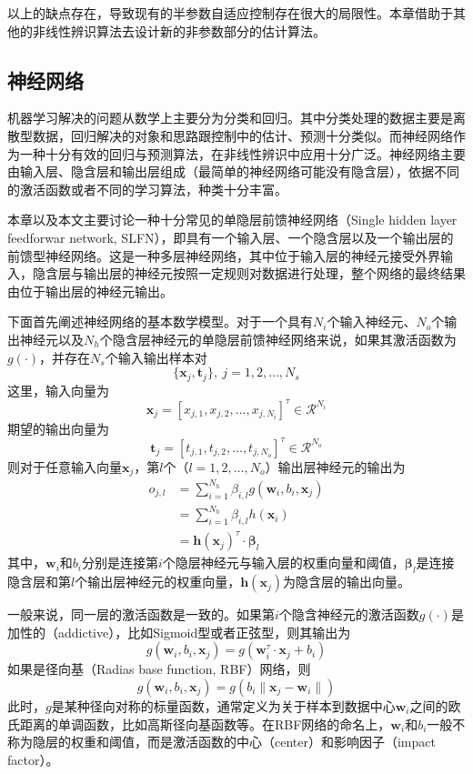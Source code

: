 以上的缺点存在，导致现有的半参数自适应控制存在很大的局限性。本章借助于其他的非线性辨识算法去设计新的非参数部分的估计算法。

\subsection{神经网络}
机器学习解决的问题从数学上主要分为分类和回归。其中分类处理的数据主要是离散型数据，回归解决的对象和思路跟控制中的估计、预测十分类似。而神经网络作为一种十分有效的回归与预测算法，在非线性辨识中应用十分广泛。神经网络主要由输入层、隐含层和输出层组成（最简单的神经网络可能没有隐含层），依据不同的激活函数或者不同的学习算法，种类十分丰富。

本章以及本文主要讨论一种十分常见的单隐层前馈神经网络（Single hidden layer feedforwar network, SLFN），即具有一个输入层、一个隐含层以及一个输出层的前馈型神经网络。这是一种多层神经网络，其中位于输入层的神经元接受外界输入，隐含层与输出层的神经元按照一定规则对数据进行处理，整个网络的最终结果由位于输出层的神经元输出。

下面首先阐述神经网络的基本数学模型。对于一个具有$N_{i}$个输入神经元、$N_{o}$个输出神经元以及$N_{h}$个隐含层神经元的单隐层前馈神经网络来说，如果其激活函数为$g(\cdot)$，并存在$N_{s}$个输入输出样本对
$$\{\bm{x}_{j},\bm{t}_{j}\},\ j=1,2,\ldots,N_{s}$$
这里，输入向量为
$$\bm{x}_{j}=[x_{j,1},x_{j,2},\ldots,x_{j,N_{i}}]^{\tau}\in \mathcal{R}^{N_{i}}$$
期望的输出向量为
$$\bm{t}_{j}=[t_{j,1},t_{j,2},\ldots,t_{j,N_{o}}]^{\tau}\in \mathcal{R}^{N_{o}}$$
则对于任意输入向量$\bm{x}_{j}$，第$l$个（$l=1,2,\dots,N_{o}$）输出层神经元的输出为
\begin{equation}%
\label{eq:4.slfn.o}
\begin{split}%
o_{j,l}&=\sum_{i=1}^{N_{h}} \beta_{i,l} g(\bm{w}_{i},b_{i},\bm{x}_{j})\\
&=\sum_{i=1}^{N_{h}} \beta_{i,l} h(\bm{x}_{i})\\
&=\bm{h}(\bm{x}_{j})^{\tau}\cdot\bm{\beta}_{l}
\end{split}
\end{equation}
其中，$\bm{w}_{i}$和$b_{i}$分别是连接第$i$个隐层神经元与输入层的权重向量和阈值，$\bm{\beta}_{l}$是连接隐含层和第$l$个输出层神经元的权重向量，$\bm{h}(\bm{x}_{j})$为隐含层的输出向量。

一般来说，同一层的激活函数是一致的。如果第$i$个隐含神经元的激活函数$g(\cdot)$是加性的（addictive），比如Sigmoid型或者正弦型，则其输出为
\begin{equation}%
g(\bm{w}_{i},b_{i},\bm{x}_{j})=g(\bm{w}_{i}^{\tau}\cdot\bm{x}_{j}+b_{i})
\end{equation}
如果是径向基（Radias base function, RBF）网络，则
\begin{equation}%
g(\bm{w}_{i},b_{i},\bm{x}_{j})=g(b_{i}\|\bm{x}_{j}-\bm{w}_{i}\|)
\end{equation}
此时，$g$是某种径向对称的标量函数，通常定义为关于样本到数据中心$\bm{w}_{i}$之间的欧氏距离的单调函数，比如高斯径向基函数等。在RBF网络的命名上，$\bm{w}_{i}$和$b_{i}$一般不称为隐层的权重和阈值，而是激活函数的中心（center）和影响因子（impact factor）。

